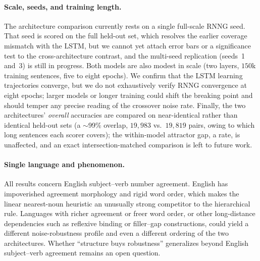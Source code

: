 \paragraph{Scale, seeds, and training length.}
The architecture comparison currently rests on a single full-scale RNNG seed.
That seed is scored on the full held-out set, which resolves the earlier coverage
mismatch with the LSTM, but we cannot yet attach error bars or a significance
test to the cross-architecture contrast, and the multi-seed replication (seeds~1
and~3) is still in progress. Both models are also modest in scale (two layers,
$150$k training sentences, five to eight epochs). We confirm that the LSTM
learning trajectories converge, but we do not exhaustively verify RNNG
convergence at eight epochs; larger models or longer training could shift the
breaking point and should temper any precise reading of the crossover noise rate.
Finally, the two architectures' \emph{overall} accuracies are compared on
near-identical rather than identical held-out sets (a $\sim$99\% overlap,
$19{,}983$ vs.\ $19{,}819$ pairs, owing to which long sentences each scorer
covers); the within-model attractor gap, a rate, is unaffected, and an exact
intersection-matched comparison is left to future work.

\paragraph{Single language and phenomenon.}
All results concern English subject--verb number agreement. English has
impoverished agreement morphology and rigid word order, which makes the linear
nearest-noun heuristic an unusually strong competitor to the hierarchical rule.
Languages with richer agreement or freer word order, or other long-distance
dependencies such as reflexive binding or filler--gap constructions, could yield
a different noise-robustness profile and even a different ordering of the two
architectures. Whether ``structure buys robustness'' generalizes beyond English
subject--verb agreement remains an open question.
